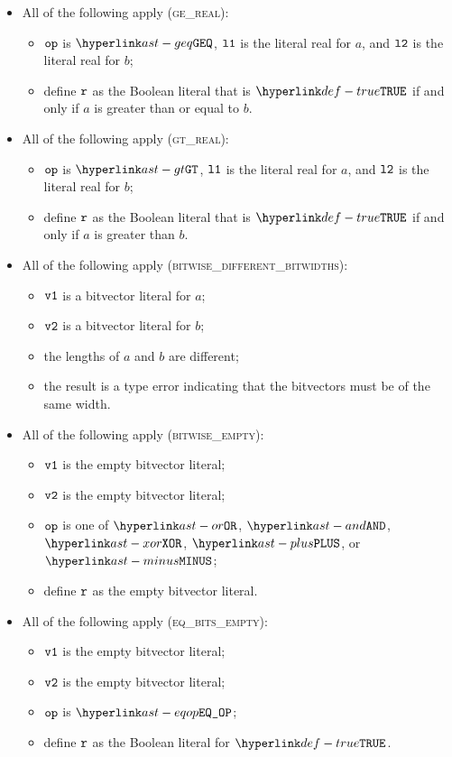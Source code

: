 \begin{itemize}
  \item All of the following apply (\textsc{ge\_real}):
  \begin{itemize}
    \item $\texttt{op}$ is $\GEQ$, $\texttt{l1}$ is the literal real for $a$, and $\texttt{l2}$ is the literal real for $b$;
    \item define $\texttt{r}$ as the Boolean literal that is $\True$ if and only if $a$ is greater than or equal to $b$.
  \end{itemize}

  \item All of the following apply (\textsc{gt\_real}):
  \begin{itemize}
    \item $\texttt{op}$ is $\GT$, $\texttt{l1}$ is the literal real for $a$, and $\texttt{l2}$ is the literal real for $b$;
    \item define $\texttt{r}$ as the Boolean literal that is $\True$ if and only if $a$ is greater than $b$.
  \end{itemize}

  \item All of the following apply (\textsc{bitwise\_different\_bitwidths}):
  \begin{itemize}
    \item $\texttt{v1}$ is a bitvector literal for $a$;
    \item $\texttt{v2}$ is a bitvector literal for $b$;
    \item the lengths of $a$ and $b$ are different;
    \item the result is a type error indicating that the bitvectors must be of the same width.
  \end{itemize}

  \item All of the following apply (\textsc{bitwise\_empty}):
  \begin{itemize}
    \item $\texttt{v1}$ is the empty bitvector literal;
    \item $\texttt{v2}$ is the empty bitvector literal;
    \item $\texttt{op}$ is one of $\OR$, $\AND$, $\XOR$, $\PLUS$, or $\MINUS$;
    \item define $\texttt{r}$ as the empty bitvector literal.
  \end{itemize}

  \item All of the following apply (\textsc{eq\_bits\_empty}):
  \begin{itemize}
    \item $\texttt{v1}$ is the empty bitvector literal;
    \item $\texttt{v2}$ is the empty bitvector literal;
    \item $\texttt{op}$ is $\EQOP$;
    \item define $\texttt{r}$ as the Boolean literal for $\True$.
  \end{itemize}


\end{itemize}
